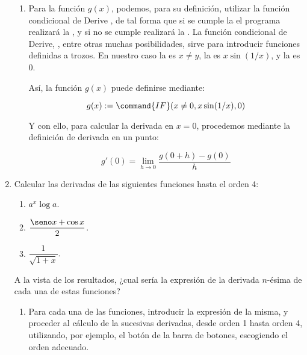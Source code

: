\begin{enumerate}[leftmargin=*]
\begin{indication}
{\begin{enumerate}
\[
f'(1) = \mathop {\lim }\limits_{h \to 0} \frac{{f(1 + h) - f(1)}}
{h}
\]

\item Para la función $g(x)$, podemos, para su definición,
utilizar la función condicional de Derive
, de tal forma que si se
cumple la  el programa realizará la
, y si no se cumple realizará la . La función condicional de Derive, , entre otras
muchas posibilidades, sirve para introducir funciones definidas a
trozos. En nuestro caso la  es $x\neq y$, la
 es $x\sin(1/x)$, y la  es $0$.

Así, la función $g(x)$ puede definirse mediante:

\[
g(x):=\command{IF}(x\neq0,x\sin(1/x),0)
\]


Y con ello, para calcular la derivada en $x=0$, procedemos mediante
la definición de derivada en un punto:


\[
g'(0) = \mathop {\lim }\limits_{h \to 0} \frac{{g(0 + h) - g(0)}}
{h}
\]



\end{enumerate}
}
\end{indication}


\item  Calcular las derivadas de las siguientes funciones hasta el
orden 4:

\begin{enumerate}
\item  $a^x\log a$.

\item  $\dfrac{\seno x +\cos x}{2}$.

\item  $\dfrac{1}{\sqrt{1+x}}$.
\end{enumerate}

A la vista de los resultados, ¿cual sería la expresión de la
derivada $n$-ésima de cada una de estas funciones?

\begin{indication}
{
\begin{enumerate}
\item Para cada una de las funciones, introducir la expresión de
la misma, y proceder al cálculo de la sucesivas derivadas, desde
orden 1 hasta orden 4, utilizando, por ejemplo, el botón
 de la barra de botones, escogiendo el
orden adecuado.


\end{enumerate}}
\end{indication}
\end{enumerate}
